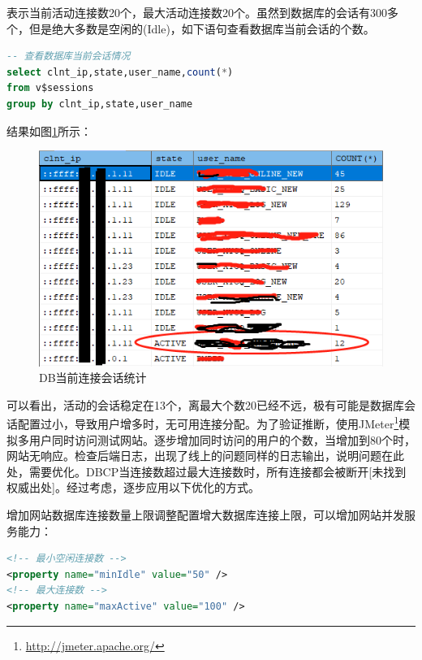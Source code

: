 \documentclass[8pt]{book}
\makeatletter
\numberwithin{dummy}{section}
\theoremstyle{ocrenumbox}
\theoremstyle{blacknumex}
\theoremstyle{blacknumbox}
\theoremstyle{ocrenum}
\renewcommand\paragraph{\@startsection{paragraph}{4}{\z@}
	{-2ex \@plus-.2ex \@minus .2ex}
	{.1ex}
	{\normalfont\small\sffamily\bfseries}}
\makeatother
\begin{document}
表示当前活动连接数20个，最大活动连接数20个。虽然到数据库的会话有300多个，但是绝大多数是空闲的(Idle)，如下语句查看数据库当前会话的个数。

\begin{lstlisting}[language=SQL]
-- 查看数据库当前会话情况
select clnt_ip,state,user_name,count(*)
from v$sessions
group by clnt_ip,state,user_name
\end{lstlisting}

结果如图\ref{fig:sessionstatistics}所示：

\begin{figure}[htbp]
	\centering
	\includegraphics[scale=0.6]{sessionstatistics.png}
	\caption{DB当前连接会话统计}
	\label{fig:sessionstatistics}
\end{figure}

可以看出，活动的会话稳定在13个，离最大个数20已经不远，极有可能是数据库会话配置过小，导致用户增多时，无可用连接分配。为了验证推断，使用JMeter\footnote{\url{http://jmeter.apache.org/}}模拟多用户同时访问测试网站。逐步增加同时访问的用户的个数，当增加到80个时，网站无响应。检查后端日志，出现了线上的问题同样的日志输出，说明问题在此处，需要优化。DBCP当连接数超过最大连接数时，所有连接都会被断开[未找到权威出处]。经过考虑，逐步应用以下优化的方式。

\paragraph{增加网站数据库连接数量上限}调整配置增大数据库连接上限，可以增加网站并发服务能力：

\begin{lstlisting}[language=XML]
<!-- 最小空闲连接数 -->
<property name="minIdle" value="50" />
<!-- 最大连接数 -->
<property name="maxActive" value="100" />
\end{lstlisting}
\end{document}
